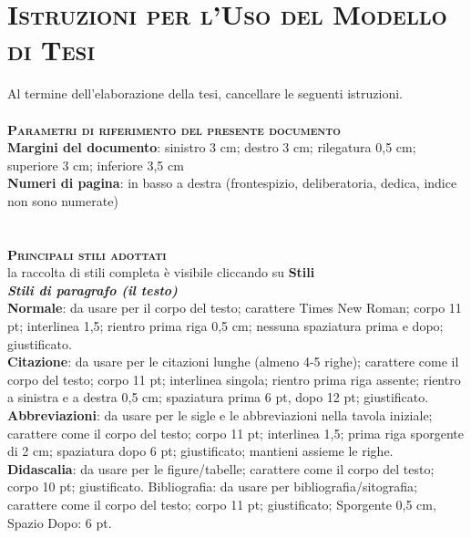 \chapter*{\scshape Istruzioni per l'Uso del Modello di Tesi}

Al termine dell’elaborazione della tesi, cancellare le seguenti istruzioni. \\ \\


\textbf{\scshape Parametri di riferimento del presente documento} \\

\textbf{Margini del documento}: sinistro 3 cm; destro 3 cm; rilegatura 0,5 cm; superiore 3 cm; inferiore 3,5 cm \\

\textbf{Numeri di pagina}: in basso a destra (frontespizio, deliberatoria, dedica, indice non sono numerate) \\ \\ \\

\textbf{\scshape Principali stili adottati} \\
la raccolta di stili completa è visibile cliccando su \textbf{Stili}\\

\textbf{\textit{Stili di paragrafo (il testo)}}\\

\textbf{Normale}: da usare per il corpo del testo; carattere Times New Roman; corpo 11 pt; interlinea 1,5; rientro prima riga 0,5 cm; nessuna spaziatura prima e dopo; giustificato. \\

\textbf{Citazione}: da usare per le citazioni lunghe (almeno 4-5 righe); carattere come il corpo del testo; corpo 11 pt; interlinea singola; rientro prima riga assente; rientro a sinistra e a destra 0,5 cm; spaziatura prima 6 pt, dopo 12 pt; giustificato. \\

\textbf{Abbreviazioni}: da usare per le sigle e le abbreviazioni nella tavola iniziale; carattere come il corpo del testo; corpo 11 pt; interlinea 1,5; prima riga sporgente di 2 cm; spaziatura dopo 6 pt; giustificato; mantieni assieme le righe. \\

\textbf{Didascalia}: da usare per le figure/tabelle; carattere come il corpo del testo; corpo 10 pt; giustificato.
Bibliografia: da usare per bibliografia/sitografia; carattere come il corpo del testo; corpo 11 pt; giustificato; Sporgente 0,5 cm, Spazio Dopo: 6 pt.\\

